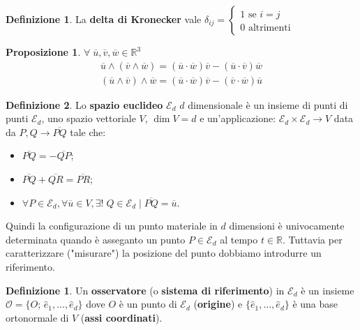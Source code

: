 \documentclass{book}
\theoremstyle{plain}
\theoremstyle{plain}
\theoremstyle{plain}
\theoremstyle{plain}
\theoremstyle{plain}
\newtheorem*{prop*}{Proposizione}
\theoremstyle{definition}
\newtheorem{defi}{Definizione}[chapter]
\newtheorem*{defi*}{Definizione}
\theoremstyle{remark}
\theoremstyle{definition}
\begin{document}
\begin{defi*}
    La \textbf{delta di Kronecker} vale $\delta_{ij}=
    \begin{cases}
        1 \text{ se } i=j \\
        0 \text{ altrimenti}
    \end{cases}$
\end{defi*}

\begin{prop*}
    $\forall\;\overline{u}, \overline{v}, \overline{w} \in \mathbb{R}^3$
    \begin{gather*}
        \overline{u}\wedge(\overline{v}\wedge\overline{w})=(\overline{u}\cdot\overline{w})\overline{v}-(\overline{u}\cdot\overline{v})\overline{w} \\ (\overline{u}\wedge\overline{v})\wedge\overline{w}=(\overline{u}\cdot\overline{w})\overline{v}-(\overline{v}\cdot\overline{w})\overline{u}
    \end{gather*}
\end{prop*}

\begin{defi*}
    Lo \textbf{spazio euclideo} $\mathcal{E}_d$ $d$ dimensionale è un insieme di punti di punti $\mathcal{E}_d$, uno spazio vettoriale $V$, $\dim{V}=d$ e un'applicazione: $\mathcal{E}_d \times \mathcal{E}_d \to V$ data da $P, Q \to \overline{PQ}$ tale che:
    \begin{itemize}
	\item $\overline{PQ} = - \overline{QP}$;
	\item $\overline{PQ} + \overline{QR} = \overline{PR}$;
	\item $\forall P \in \mathcal{E}_d, \forall \overline{u} \in V, \exists! \; Q \in \mathcal{E}_d \mid \overline{PQ} = \overline{u}$.
    \end{itemize}
\end{defi*}

\noindent Quindi la configurazione di un punto materiale in $d$ dimensioni è univocamente determinata quando è asseganto un punto $P \in \mathcal{E}_d$ al tempo $t \in \mathbb{R}$. Tuttavia per caratterizzare ("misurare") la posizione del punto dobbiamo introdurre un riferimento.

\begin{defi}
	Un \textbf{osservatore} (o \textbf{sistema di riferimento}) in $\mathcal{E}_d$ è un insieme $\mathcal{O}=\{O;\, \hat{e}_1, \ldots, \hat{e}_d\}$ dove $O$ è un punto di $\mathcal{E}_d$ (\textbf{origine}) e $\{\hat{e}_1, \ldots, \hat{e}_d\}$ è una base ortonormale di $V$ (\textbf{assi coordinati}).
\end{defi}
\end{document}
